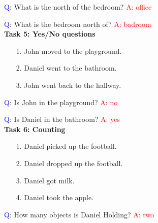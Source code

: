 \documentclass{article}
\begin{document}
\textcolor{blue}{Q}: What is the north of the bedroom?
\textcolor{red}{A: office}

\textcolor{blue}{Q}: What is the bedroom north of?
\textcolor{red}{A: badroom}\\


\textbf{Task 5: Yes/No questions}

\begin{itemize}

	\item[1.] John moved to the playground.
	\item[2.] Daniel went to the bathroom.
	\item[3.] John went back to the hallway.

\end{itemize}

\textcolor{blue}{Q}: Is John in the playground?
\textcolor{red}{A: no}

\textcolor{blue}{Q}: Is Daniel in the bathroom?
\textcolor{red}{A: yes}\\

\textbf{Task 6: Counting}

\begin{itemize}

	\item[1.] Daniel picked up the football.
	\item[2.] Daniel dropped up the football.
	\item[3.] Daniel got milk.
	\item[4.] Daniel took the apple.

\end{itemize}

\textcolor{blue}{Q}: How many objects is Daniel Holding?
\textcolor{red}{A: two} \\


\end{document}

